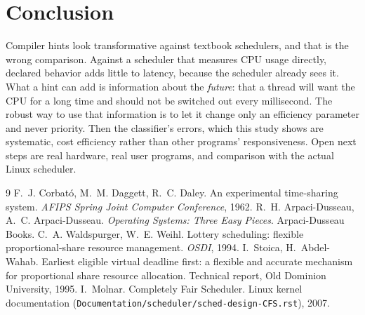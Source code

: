 \documentclass[10pt,twocolumn]{article}
\begin{document}
\section{Conclusion}
Compiler hints look transformative against textbook schedulers, and that is the wrong
comparison. Against a scheduler that measures CPU usage directly, declared behavior adds
little to latency, because the scheduler already sees it. What a hint can add is
information about the \emph{future}: that a thread will want the CPU for a long time and
should not be switched out every millisecond. The robust way to use that information is to
let it change only an efficiency parameter and never priority. Then the classifier's
errors, which this study shows are systematic, cost efficiency rather than other programs'
responsiveness. Open next steps are real hardware, real user programs, and comparison with
the actual Linux scheduler.

\begin{thebibliography}{9}\small
{} F.~J. Corbató, M.~M. Daggett, R.~C. Daley. An experimental time-sharing
system. \emph{AFIPS Spring Joint Computer Conference}, 1962.
 R.~H. Arpaci-Dusseau, A.~C. Arpaci-Dusseau. \emph{Operating Systems: Three
Easy Pieces}. Arpaci-Dusseau Books.
 C.~A. Waldspurger, W.~E. Weihl. Lottery scheduling: flexible
proportional-share resource management. \emph{OSDI}, 1994.
 I.~Stoica, H.~Abdel-Wahab. Earliest eligible virtual deadline first: a
flexible and accurate mechanism for proportional share resource allocation. Technical
report, Old Dominion University, 1995.
 I.~Molnar. Completely Fair Scheduler. Linux kernel documentation
(\texttt{Documentation/scheduler/sched-design-CFS.rst}), 2007.
\end{thebibliography}
\end{document}

